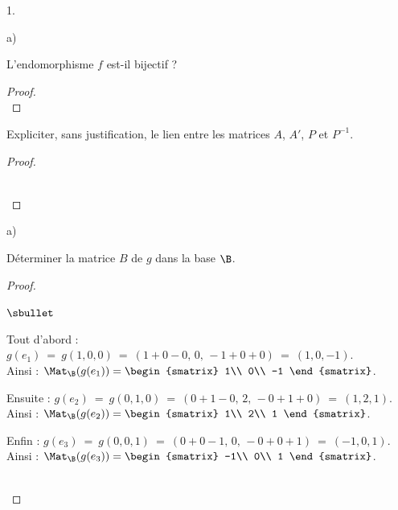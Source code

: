\documentclass[11pt]{article}%
\begin{document}
\begin{noliste}{1.}
\begin{noliste}{a)}
    
    \item L'endomorphisme $f$ est-il bijectif ?
    
    \begin{proof}~
      ~\\[-1cm]
    \end{proof}

    
    \item Expliciter, sans justification, le lien entre les matrices 
    $A$, $A'$, $P$ et $P^{-1}$.
    
    \begin{proof}~
      
      ~\\[-1.4cm]
    \end{proof}
  \end{noliste}
  
  \item 
  \begin{noliste}{a)}
    \setlength{\itemsep}{2mm}
    \item Déterminer la matrice $B$ de $g$ dans la base $\B$.
    
    \begin{proof}~
      \begin{noliste}{$\sbullet$}
	\item Tout d'abord : $g(e_1) \ = \ g(1,0,0) \ = \ (1+0-0, \, 0, 
	\, -1+0+0) \ = \ (1,0,-1)$. \\[.1cm]
	Ainsi : $\Mat_\B(g(e_1)) = 
	\begin{smatrix}
	  1\\
	  0\\
	  -1
	\end{smatrix}$.
	
	\item Ensuite : $g(e_2) \ = \ g(0,1,0) \ = \ (0+1-0, \, 2, \, -0
	+1+0) \ = \ (1,2,1)$. \\[.1cm]
	Ainsi : $\Mat_\B(g(e_2)) = 
	\begin{smatrix}
	  1\\
	  2\\
	  1
	\end{smatrix}$.
	
	\item Enfin : $g(e_3) \ = \ g(0,0,1) \ = \ (0+0-1, \, 0, \, -0
	+0+1) \ = \ (-1,0,1)$. \\[.1cm]
	Ainsi : $\Mat_\B(g(e_3)) = 
	\begin{smatrix}
	  -1\\
	  0\\
	  1
	\end{smatrix}$.
      \end{noliste}
      ~\\[-1cm]
    \end{proof}


\end{noliste}
\end{noliste}
\end{document}

